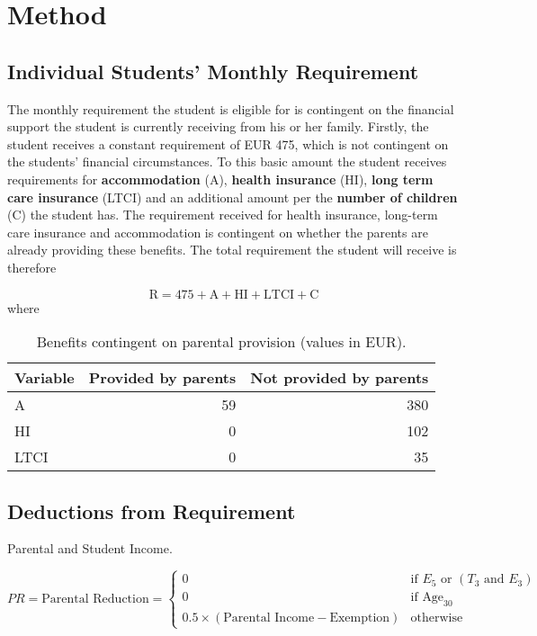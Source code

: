 \section{Method}


\subsection{Individual Students' Monthly Requirement}
The monthly requirement the student is eligible for is contingent on the financial support 
the student is currently receiving from his or her family. 
Firstly, the student receives a constant requirement of EUR 475, which is not contingent on the students' financial 
circumstances. To this basic amount the student receives requirements for \textbf{accommodation} (A), 
\textbf{health insurance} (HI), \textbf{long term care insurance} (LTCI) and an additional amount per the 
\textbf{number of children} (C) the student has. 
The requirement received for health insurance, long-term care insurance and accommodation is contingent on 
whether the parents are already providing these benefits. 
The total requirement the student will receive is therefore 

\begin{equation} \label{eq:total-requirement}
  \text{R} = 475 + \text{A} + \text{HI} + \text{LTCI} + \text{C}
\end{equation}
where
\begin{table}[H]
\small
\centering
  \begin{tabular}{lrr}
  \hline
  Variable & Provided by parents & Not provided by parents \\
  \hline
  A & 59 & 380 \\
  HI & 0 & 102 \\
  LTCI & 0 & 35 \\
  \hline
  \end{tabular}
\caption{Benefits contingent on parental provision (values in EUR).}
\end{table}







\subsection{Deductions from Requirement}
Parental and Student Income.

\begin{equation} \label{eq:parental-reduction}
  PR = \text{Parental Reduction} = 
  \begin{cases}
    0 & \text{if } E_5 \text{ or } (T_3 \text{ and } E_3) \\
    0 & \text{if } \text{Age}_{30} \\
    0.5 \times (\text{Parental Income} - \text{Exemption}) & \text{otherwise}
  \end{cases}
\end{equation}


